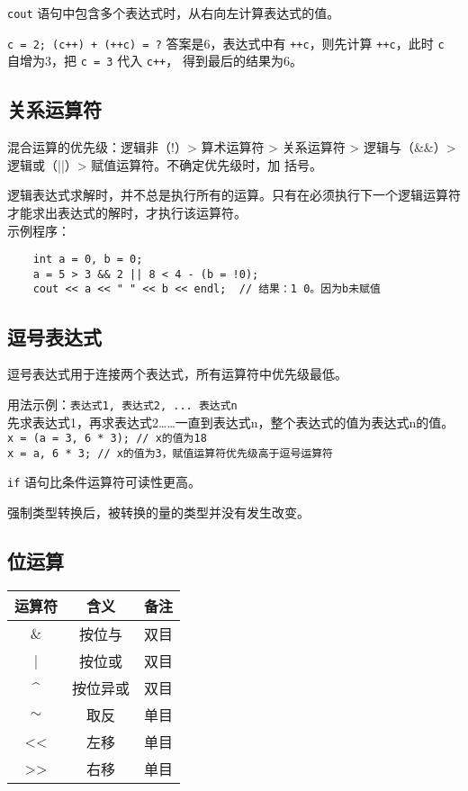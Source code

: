 \documentclass[UTF8]{ctexart}
\begin{document}
\texttt{cout} 语句中包含多个表达式时，从右向左计算表达式的值。

\texttt{c = 2; (c++) + (++c) = ?} 答案是6，表达式中有 \texttt{++c}，则先计算
\texttt{++c}，此时 \texttt{c} 自增为3，把 \texttt{c = 3} 代入 \texttt{c++}，
得到最后的结果为6。

\subsection{关系运算符}
混合运算的优先级：逻辑非（!）> 算术运算符 > 关系运算符 > 逻辑与（\&\&）> 逻辑或（||）> 赋值运算符。不确定优先级时，加
括号。

逻辑表达式求解时，并不总是执行所有的运算。只有在必须执行下一个逻辑运算符才能求出表达式的解时，才执行该运算符。\\
示例程序：
\begin{verbatim}
    int a = 0, b = 0;
    a = 5 > 3 && 2 || 8 < 4 - (b = !0);
    cout << a << " " << b << endl;  // 结果：1 0。因为b未赋值
\end{verbatim}

\subsection{逗号表达式}
逗号表达式用于连接两个表达式，所有运算符中优先级最低。

用法示例：\texttt{表达式1, 表达式2, ... 表达式n}\\
先求表达式1，再求表达式2……一直到表达式n，整个表达式的值为表达式n的值。\\
\texttt{x = (a = 3, 6 * 3);    // x的值为18}\\
\texttt{x = a, 6 * 3;  // x的值为3，赋值运算符优先级高于逗号运算符}

\texttt{if} 语句比条件运算符可读性更高。

强制类型转换后，被转换的量的类型并没有发生改变。

\subsection{位运算}
\begin{tabular}{|c|c|c|}
    \hline
    运算符 & 含义 & 备注 \\
    \hline
    \& & 按位与 & 双目 \\
    \hline
    |  & 按位或 & 双目 \\
    \hline
    \^{} & 按位异或 & 双目 \\
    \hline
    $\sim$ & 取反 & 单目 \\
    \hline
    <{}< & 左移 & 单目 \\
    \hline
    >{}> & 右移 & 单目 \\
    \hline
\end{tabular}
\end{document}
